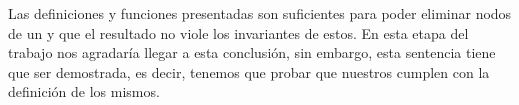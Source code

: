 Las definiciones y funciones presentadas son suficientes para poder eliminar nodos de un {\arn} y que el
resultado no viole los invariantes de estos. En esta etapa del trabajo nos agradar\'ia llegar a esta 
conclusi\'on, sin embargo, esta sentencia tiene que ser demostrada, es decir, tenemos que
probar que nuestros {\arns} cumplen con la  definici\'on de los mismos.
